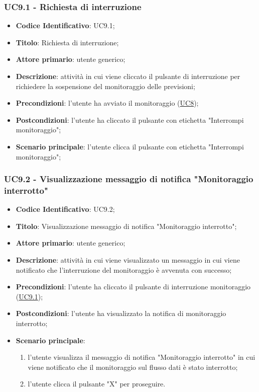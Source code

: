 		\subsubsection{UC9.1 - Richiesta di interruzione}
		\begin{itemize}
			\item\textbf{Codice Identificativo}: UC9.1;
			\item\textbf{Titolo}: Richiesta di interruzione;
			\item\textbf{Attore primario}: utente generico;
			\item\textbf{Descrizione}: attività in cui viene cliccato il pulsante di interruzione per richiedere la sospensione del monitoraggio delle previsioni;
			\item\textbf{Precondizioni}: l'utente ha avviato il monitoraggio (\hyperref[par:UC8]{UC8});
			\item\textbf{Postcondizioni}: l'utente ha cliccato il pulsante con etichetta "Interrompi monitoraggio";
			\item\textbf{Scenario principale}:  l'utente clicca il pulsante con etichetta "Interrompi monitoraggio";
		\end{itemize}

	\label{par:UC9.2}
	\subsubsection{UC9.2 - Visualizzazione messaggio di notifica "Monitoraggio interrotto"}
		\begin{itemize}
			\item\textbf{Codice Identificativo}: UC9.2;
			\item\textbf{Titolo}: Visualizzazione messaggio di notifica "Monitoraggio interrotto";
			\item\textbf{Attore primario}: utente generico;
			\item\textbf{Descrizione}: attività in cui viene visualizzato un messaggio in cui viene notificato che l'interruzione del monitoraggio è avvenuta con successo;
			\item\textbf{Precondizioni}: l'utente ha cliccato il pulsante di interruzione monitoraggio (\hyperref[par:UC9.1]{UC9.1});
			\item\textbf{Postcondizioni}: l'utente ha visualizzato la notifica di monitoraggio interrotto;
			\item\textbf{Scenario principale}:
				\begin{enumerate}
					\item l'utente visualizza il messaggio di notifica "Monitoraggio interrotto" in cui viene notificato che il monitoraggio sul flusso dati è stato interrotto;
					\item l'utente clicca il pulsante "X" per proseguire.		
				\end{enumerate}		
		\end{itemize}
		
